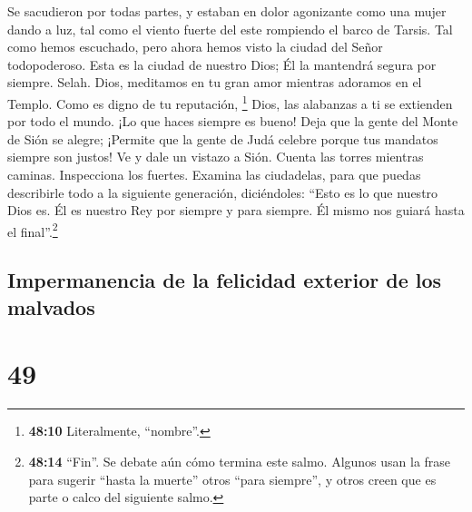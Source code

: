  Se sacudieron por todas partes, y estaban en dolor
agonizante como una mujer dando a luz,  tal como el viento
fuerte del este rompiendo el barco de Tarsis.  Tal como
hemos escuchado, pero ahora hemos visto la ciudad del Señor
todopoderoso. Esta es la ciudad de nuestro Dios; Él la mantendrá segura
por siempre. Selah.  Dios, meditamos en tu gran amor
mientras adoramos en el Templo.  Como es digno de tu
reputación, \footnote{\textbf{48:10} Literalmente, ``nombre''.} Dios,
las alabanzas a ti se extienden por todo el mundo. ¡Lo que haces siempre
es bueno!  Deja que la gente del Monte de Sión se alegre;
¡Permite que la gente de Judá celebre porque tus mandatos siempre son
justos!  Ve y dale un vistazo a Sión. Cuenta las torres
mientras caminas.  Inspecciona los fuertes. Examina las
ciudadelas, para que puedas describirle todo a la siguiente generación,
diciéndoles:  ``Esto es lo que nuestro Dios es. Él es
nuestro Rey por siempre y para siempre. Él mismo nos guiará hasta el
final''.\footnote{\textbf{48:14} ``Fin''. Se debate aún cómo termina
  este salmo. Algunos usan la frase para sugerir ``hasta la muerte''
  otros ``para siempre'', y otros creen que es parte o calco del
  siguiente salmo.}

\hypertarget{impermanencia-de-la-felicidad-exterior-de-los-malvados}{%
\subsection{Impermanencia de la felicidad exterior de los
malvados}\label{impermanencia-de-la-felicidad-exterior-de-los-malvados}}

\hypertarget{section-48}{%
\section{49}\label{section-48}}

